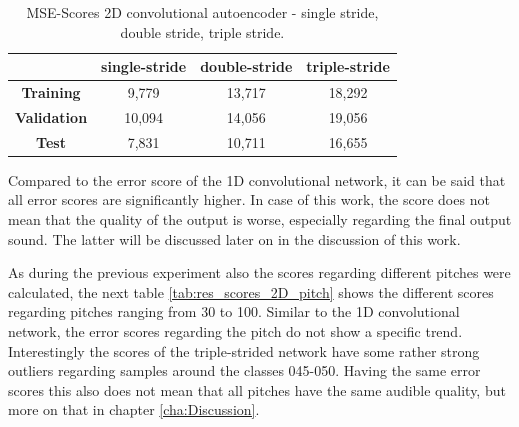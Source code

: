\begin{table}[htb!]
    \centering
    \captionsetup{justification=centering}
    \begin{tabular}{|c|c|c|c|}
        \hline
         & \textbf{single-stride} & \textbf{double-stride} & \textbf{triple-stride} \\
         \hline
        \textbf{Training} & 9,779 & 13,717 & 18,292 \\
        \hline
        \textbf{Validation} & 10,094 & 14,056 & 19,056 \\
        \hline
        \textbf{Test} & 7,831 & 10,711 & 16,655 \\
        \hline
    \end{tabular}
    \caption{MSE-Scores 2D convolutional autoencoder - single stride, double stride, triple stride.}
    \label{tab:res_scores_2Dcae}
\end{table}

Compared to the error score of the 1D convolutional network, it can be said that all error scores are significantly higher. In case of this work, the score does not mean that the quality of the output is worse, especially regarding the final output sound. The latter will be discussed later on in the discussion of this work.

As during the previous experiment also the scores regarding different pitches were calculated, the next table \ref{tab:res_scores_2D_pitch} shows the different scores regarding pitches ranging from 30 to 100. Similar to the 1D convolutional network, the error scores regarding the pitch do not show a specific trend. Interestingly the scores of the triple-strided network have some rather strong outliers regarding samples around the classes 045-050. Having the same error scores this also does not mean that all pitches have the same audible quality, but more on that in chapter \ref{cha:Discussion}. 


